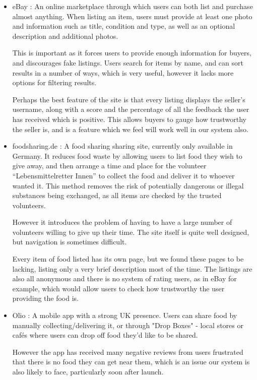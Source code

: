 \documentclass[12pt]{article}
\begin{document}
\begin{itemize}

    \item eBay \cite{ebay}: An online marketplace through which users can both list and
        purchase almost anything. When listing an item, users must provide at
        least one photo and information such as title, condition and type, as
        well as an optional description and additional photos.

        This is important as it forces users to provide enough information
        for buyers, and discourages fake listings.
        Users search for items by name, and can sort results in a number of
        ways, which is very useful, however it lacks more options for filtering
        results.
        
        Perhaps the best feature of the site is that every listing displays
        the seller’s username, along with a score and the percentage of all
        the feedback the user has received which is positive.
        This allows buyers to gauge how trustworthy the seller is, and is a
        feature which we feel will work well in our system also.


    \item foodsharing.de \cite{foodsharing}: A food sharing sharing site, currently only available
        in Germany.
        It reduces food waste by allowing users to list food they wish to give
        away, and then arrange a time and place for the volunteer
        “Lebensmittelretter Innen” to collect the food and deliver it to
        whoever wanted it.
        This method removes the risk of potentially dangerous or illegal
        substances being exchanged, as all items are checked by the trusted
        volunteers.
        
        However it introduces the problem of having to have a large number of
        volunteers willing to give up their time. The site itself is quite well
        designed, but navigation is sometimes difficult.

        Every item of food listed has its own page, but we found these pages to
        be lacking, listing only a very brief description most of the time.
        The listings are also all anonymous and there is no system of rating
        users, as in eBay for example, which would allow users to check how
        trustworthy the user providing the food is.
    
    \item Olio \cite{olio}: A mobile app with a strong UK presence.
        Users can share food by manually collecting/delivering it, or through
        "Drop Boxes" - local stores or cafés where users can drop off food
        they'd like to be shared.
        
        However the app has received many negative reviews from users frustrated
        that there is no food they can get near them, which is an issue our
        system is also likely to face, particularly soon after launch.

\end{itemize}
\end{document}
